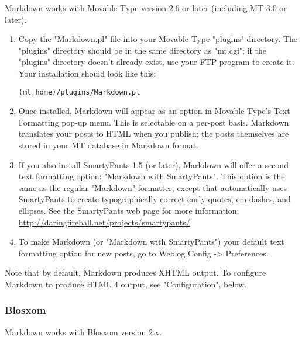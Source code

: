 Markdown works with Movable Type version 2.6 or later (including 
MT 3.0 or later).

\begin{enumerate}
\item 

Copy the "Markdown.pl" file into your Movable Type "plugins"
directory. The "plugins" directory should be in the same directory
as "mt.cgi"; if the "plugins" directory doesn't already exist, use
your FTP program to create it. Your installation should look like
this:\begin{lstlisting}
(mt home)/plugins/Markdown.pl
\end{lstlisting}

\item 

Once installed, Markdown will appear as an option in Movable Type's
Text Formatting pop-up menu. This is selectable on a per-post basis.
Markdown translates your posts to HTML when you publish; the posts
themselves are stored in your MT database in Markdown format.
\item 

If you also install SmartyPants 1.5 (or later), Markdown will offer
a second text formatting option: "Markdown with SmartyPants". This
option is the same as the regular "Markdown" formatter, except that
automatically uses SmartyPants to create typographically correct
curly quotes, em-dashes, and ellipses. See the SmartyPants web page
for more information: \href{http://daringfireball.net/projects/smartypants/}{http://daringfireball.net/projects/smartypants/}
\item 

To make Markdown (or "Markdown with SmartyPants") your default
text formatting option for new posts, go to Weblog Config ->
Preferences.
\end{enumerate}




Note that by default, Markdown produces XHTML output. To configure
Markdown to produce HTML 4 output, see "Configuration", below.

\subsubsection*{Blosxom}




Markdown works with Blosxom version 2.x.

